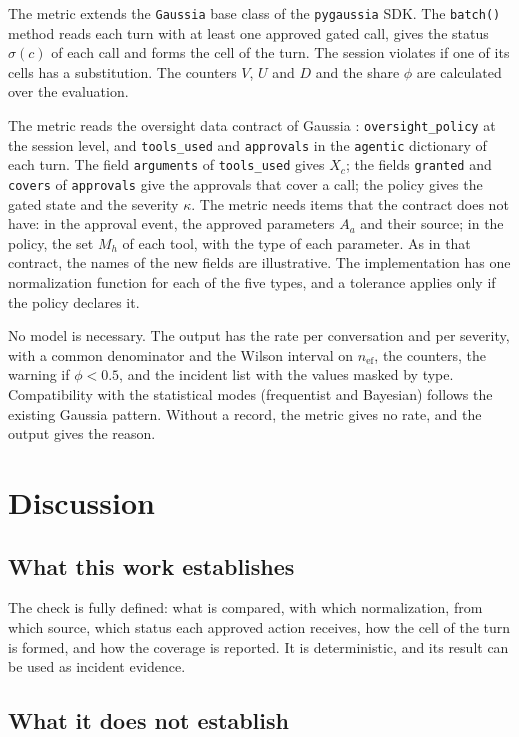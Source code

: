 \documentclass[11pt,a4paper]{article}
\begin{document}
The metric extends the \texttt{Gaussia} base class of the \texttt{pygaussia} SDK. The \texttt{batch()} method reads each turn with at least one
approved gated call, gives the status $\sigma(c)$ of each call and forms the cell of the turn. The session
violates if one of its cells has a substitution. The counters $V$, $U$ and $D$ and the share $\phi$ are
calculated over the evaluation.

The metric reads the oversight data contract of Gaussia \cite{gaussia2026}: \texttt{oversight\_policy} at the session
level, and \texttt{tools\_used} and \texttt{approvals} in the \texttt{agentic} dictionary of each turn. The field \texttt{arguments} of \texttt{tools\_used} gives $X_c$; the fields
\texttt{granted} and \texttt{covers} of \texttt{approvals} give the approvals that cover a call; the policy gives
the gated state and the severity $\kappa$. The metric needs items that the contract does not have: in the
approval event, the approved parameters $A_a$ and their source; in the policy, the set $M_h$ of each tool,
with the type of each parameter. As in that contract, the names of the new fields are illustrative. The implementation has one normalization function for each of
the five types, and a tolerance applies only if the policy declares it.

No model is necessary. The output has the rate per conversation and per severity, with a common denominator and
the Wilson interval on $n_{\mathrm{ef}}$, the counters, the warning if $\phi < 0.5$, and the incident list with
the values masked by type. Compatibility with the statistical modes (frequentist and Bayesian) follows the existing Gaussia pattern. Without a record, the metric gives no rate, and the output gives the
reason.

\section{Discussion}

\subsection{What this work establishes}

The check is fully defined: what is compared, with which normalization, from which source, which status each
approved action receives, how the cell of the turn is formed, and how the coverage is reported. It is
deterministic, and its result can be used as incident evidence.

\subsection{What it does not establish}
\end{document}
